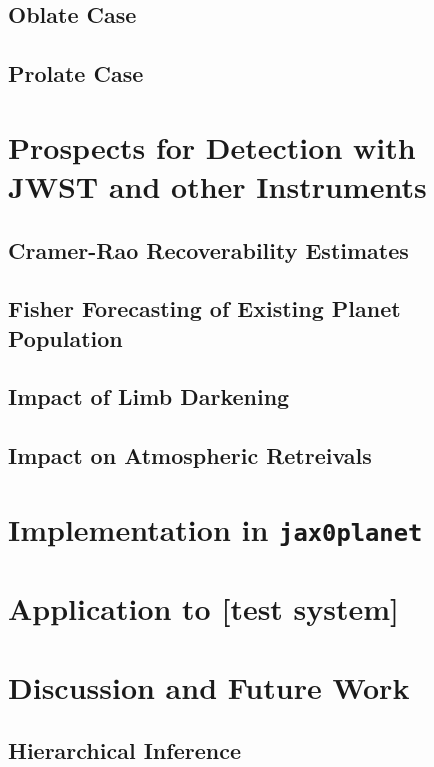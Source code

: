 \documentclass[twocolumn]{aastex631}
\begin{document}
\subsection{Oblate Case}
\subsection{Prolate Case}
\section{Prospects for Detection with JWST and other Instruments}
\label{sec:jwstdetect}
\subsection{Cramer-Rao Recoverability Estimates}
\label{sec:rec}
\subsection{Fisher Forecasting of Existing Planet Population}
\label{sec:fisherforecasting}
\subsection{Impact of Limb Darkening}
\subsection{Impact on Atmospheric Retreivals}
\section{Implementation in \lowercase{\texttt{jax0planet}}}
\label{sec:jax0planet}
\section{Application to [test system]}
\label{sec:lctest}
\section{Discussion and Future Work}
\label{disc}
\subsection{Hierarchical Inference}

\end{document}

